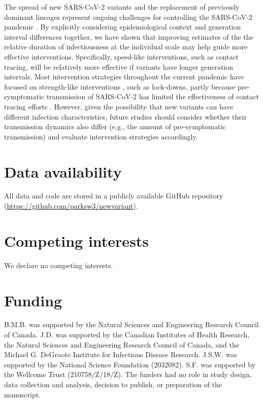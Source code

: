 \documentclass[12pt]{article}
\begin{document}
The spread of new SARS-CoV-2 variants and the replacement of previously dominant lineages represent ongoing challenges for controlling the SARS-CoV-2 pandemic \citep{abdool2021new,fontanet2021sars,walensky2021sars,pulliam2021increased}.  
By explicitly considering epidemiological context and generation interval differences together, we have shown that improving estimates of the the relative duration of infectiousness at the individual scale may help guide more effective interventions. 
Specifically, speed-like interventions, such as contact tracing, will be relatively more effective if variants have longer generation intervals.
Most intervention strategies throughout the current pandemic have focused on strength-like interventions \citep{flaxman2020Rt}, such as lock-downs, partly because pre-symptomatic transmission of SARS-CoV-2 has limited the effectiveness of contact tracing efforts \citep{hellewell2020feasibility}.
However, given the possibility that new variants can have different infection characteristics, future studies should consider whether their transmission dynamics also differ (e.g., the amount of pre-symptomatic transmission) and evaluate intervention strategies accordingly.

\section*{Data availability}

All data and code are stored in a publicly available GitHub repository (\url{https://github.com/parksw3/newvariant}).

\section*{Competing interests}

We declare no competing interests.

\section*{Funding}

B.M.B. was supported by the Natural Sciences and Engineering Research Council of Canada. 
J.D. was supported by the Canadian Institutes of Health Research, 
the Natural Sciences and Engineering Research Council of Canada, 
and the Michael G. DeGroote Institute for Infectious Disease Research.
J.S.W. was supported by the National Science Foundation (2032082).
S.F. was supported by the Wellcome Trust (210758/Z/18/Z).
The funders had no role in study design, data collection and analysis, decision to publish, or preparation of the manuscript.

\pagebreak


\end{document}
